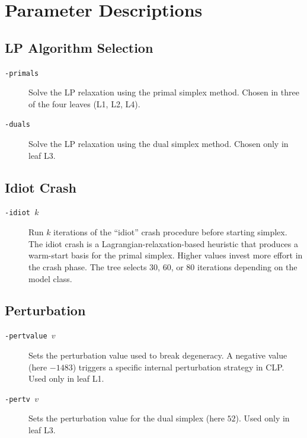 \documentclass[11pt,a4paper]{article}
\begin{document}
\section{Parameter Descriptions}

\subsection{LP Algorithm Selection}

\begin{description}
  \item[\texttt{-primals}] Solve the LP relaxation using the primal simplex
    method.  Chosen in three of the four leaves (L1, L2, L4).
  \item[\texttt{-duals}] Solve the LP relaxation using the dual simplex
    method.  Chosen only in leaf L3.
\end{description}

\subsection{Idiot Crash}

\begin{description}
  \item[\texttt{-idiot $k$}] Run $k$ iterations of the ``idiot'' crash
    procedure before starting simplex.  The idiot crash is a
    Lagrangian-relaxation-based heuristic that produces a warm-start basis
    for the primal simplex.  Higher values invest more effort in the crash
    phase.  The tree selects 30, 60, or 80 iterations depending on the
    model class.
\end{description}

\subsection{Perturbation}

\begin{description}
  \item[\texttt{-pertvalue $v$}] Sets the perturbation value used to break
    degeneracy.  A negative value (here $-1483$) triggers a specific
    internal perturbation strategy in CLP.  Used only in leaf L1.
  \item[\texttt{-pertv $v$}] Sets the perturbation value for the dual
    simplex (here $52$).  Used only in leaf L3.
\end{description}
\end{document}
